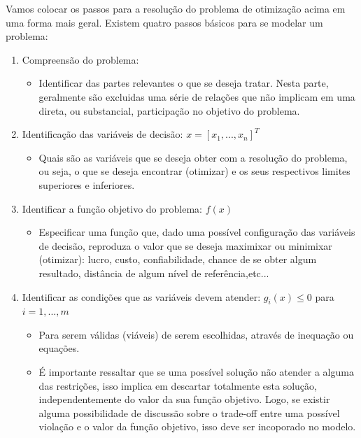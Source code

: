 Vamos colocar os passos para a resolução do problema de otimização acima em uma forma mais geral. Existem quatro passos básicos para se modelar um problema:
\begin{enumerate}
\item Compreensão do problema: 

\begin{itemize}
\item Identificar das partes relevantes o que se deseja tratar. Nesta parte,
geralmente são excluidas uma série de relações que não implicam em
uma direta, ou substancial, participação no objetivo do problema.
\end{itemize}
\item Identificação das variáveis de decisão: $x=[x_{1},...,x_{n}]^{T}$

\begin{itemize}
\item Quais são as variáveis que se deseja obter com a resolução do problema,
ou seja, o que se deseja encontrar (otimizar) e os seus respectivos
limites superiores e inferiores.
\end{itemize}
\item Identificar a função objetivo do problema: $f(x)$

\begin{itemize}
\item Especificar uma função que, dado uma possível configuração das variáveis
de decisão, reproduza o valor que se deseja maximixar ou minimixar
(otimizar): lucro, custo, confiabilidade, chance de se obter algum
resultado, distância de algum nível de referência,etc...
\end{itemize}
\item Identificar as condições que as variáveis devem atender: $g_{i}(x)\leq0$
para $i=1,...,m$

\begin{itemize}
\item Para serem válidas (viáveis) de serem escolhidas, através de inequação
ou equações.
\item É importante ressaltar que se uma possível solução não atender a alguma
das restrições, isso implica em descartar totalmente esta solução,
independentemente do valor da sua função objetivo. Logo, se existir
alguma possibilidade de discussão sobre o trade-off entre uma possível
violação e o valor da função objetivo, isso deve ser incoporado no
modelo.
\end{itemize}
\end{enumerate}

